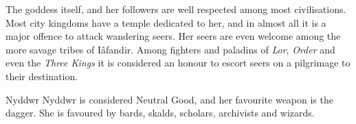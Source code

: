The goddess itself, and her followers are well respected among most
civilisations. Most city kingdoms have a temple dedicated to her, and in almost
all it is a major offence to attack wandering seers. Her seers are even welcome
among the more savage tribes of Iâfandir. Among fighters and paladins of
\emph{Lor}, \emph{Order} and even the \emph{Three Kings} it is considered an
honour to escort seers on a pilgrimage to their destination.

\begin{35e}{Nyddwr}
  Nyddwr is considered Neutral Good, and her favourite weapon is the dagger.
  She is favoured by bards, skalds, scholars, archivists and wizards.
\end{35e}
